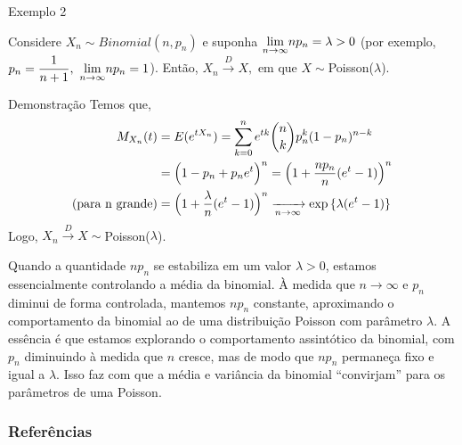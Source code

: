\documentclass[12pt]{beamer}
\begin{document}
\begin{frame}{Exemplo 2}
	\vspace{-0.5cm}
	\begin{block}{}
		\justifying
		Considere $X_{n}\sim Binomial(n,p_{n})$ e suponha ${\displaystyle {\displaystyle \lim_{n\to\infty}} np_{n}=\lambda>0}$ (por exemplo, $p_{n}=\dfrac{1}{n+1},~{\displaystyle \lim_{n\to\infty}} np_{n}=1$). Então, $X_{n} \overset{D}{\rightarrow} X,$ em que $X\sim$Poisson($\lambda$).
	\end{block}
	\pause
	\vspace{-0.3cm}
	\begin{block}{Demonstração}
		\justifying
		Temos que,
		\begin{align*}
			M_{X_{n}}(t)&=E(e^{tX_{n}})={\displaystyle \sum_{k=0}^{n}e^{tk}\binom{n}{k}p_{n}^{k}(1-p_{n})^{n-k}}\\
			&=\Big(1-p_{n}+p_{n}e^{t}\Big)^{n}=\Big(1+\dfrac{np_{n}}{n}(e^{t}-1)\Big)^{n}\\
			\text{(para n grande)}    &=\Big(1+\dfrac{\lambda}{n}(e^{t}-1)\Big)^{n}\xrightarrow[n\rightarrow\infty]{} \exp{\{\lambda(e^{t}-1)\}}
		\end{align*}
		Logo, $X_{n} \overset{D}{\rightarrow} X\sim$Poisson($\lambda$).
	\end{block}
\end{frame}

\begin{frame}
	\begin{block}{}
		\justifying
		Quando a quantidade \( np_n \) se estabiliza em um valor \( \lambda > 0 \), estamos essencialmente controlando a média da binomial. À medida que \( n \to \infty \) e \( p_n \) diminui de forma controlada, mantemos \( np_n \) constante, aproximando o comportamento da binomial ao de uma distribuição Poisson com parâmetro \( \lambda \). A essência é que estamos explorando o comportamento assintótico da binomial, com \( p_n \) diminuindo à medida que \( n \) cresce, mas de modo que \( np_n \) permaneça fixo e igual a \( \lambda \). Isso faz com que a média e variância da binomial ``convirjam'' para os parâmetros de uma Poisson.
		
		
	\end{block}
\end{frame}

\begin{frame}[allowframebreaks]
\frametitle{\bf Referências}
\printbibliography
\end{frame}
\end{document}

